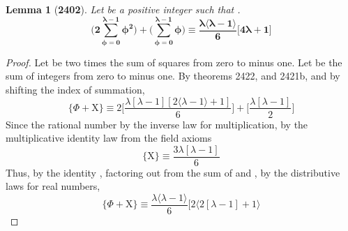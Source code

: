 \documentclass[preview]{standalone}
\newtheorem{lemma}{Lemma}
\begin{document}
\begin{lemma}[\textbf{2402}]
    Let \bm{$\iota$} be a positive integer such that
    \bm{$\big \lfloor \sqrt{\iota} \big \rfloor = \lambda$}.
    \begin{equation*}
        \bm{
            \Bigg( 2\sum_{\phi=0}^{\lambda - 1} \phi ^2 \Bigg)
                + 
            \Bigg( \sum_{\phi=0}^{\lambda - 1} \phi \Bigg)
                \equiv
            \frac{
                \lambda
                \big \langle \lambda - 1 \big \rangle
            }
            {6}
            \Bigg[
                4 \lambda + 1
            \Bigg]
        }
    \end{equation*}
\end{lemma}

\begin{proof}
    Let \bm{$\Phi$} be two times the sum of squares from zero to \bm{$\lambda$} minus one.
    Let  be the sum of integers from zero to \bm{$\lambda$} minus one.
    By theorems 2422, and 2421b, and by shifting the index of summation,
    \begin{equation*}
        \Bigg\{
            \Phi + \mathrm{X}
        \Bigg\}
            \equiv
        2
        \Bigg[
            \frac{ 
                \lambda [ \lambda - 1 ]
                [ 2 \langle \lambda - 1 \rangle + 1 ] 
            }
            {6}
        \Bigg]
            +
        \Bigg[
            \frac{\lambda [ \lambda - 1 ] }
            {2}
        \Bigg]
    \end{equation*}
    Since the rational number 
    by the inverse law for multiplication,
    by the multiplicative identity law from the field axioms
    \begin{equation*}
        \bigg \{ \mathrm{X} \bigg\}   
            \equiv
        \frac{
            3
            \lambda [ \lambda - 1 ]
        }
        {6}
    \end{equation*}
    Thus, 
    by the identity , 
    factoring
    out from the sum of \bm{$\Phi$} and , 
    by the distributive laws for real numbers,
    \begin{equation*}
        \Bigg\{
            \Phi
                +
            \mathrm{X}
        \Bigg\}
            \equiv
        \frac{
            \lambda
            \big \langle \lambda - 1 \big \rangle
        }
        {6}
        \Bigg[
            2 \bigg \langle 2 [ \lambda - 1 ] + 1 \bigg \rangle

\end{equation*}
\end{proof}
\end{document}
